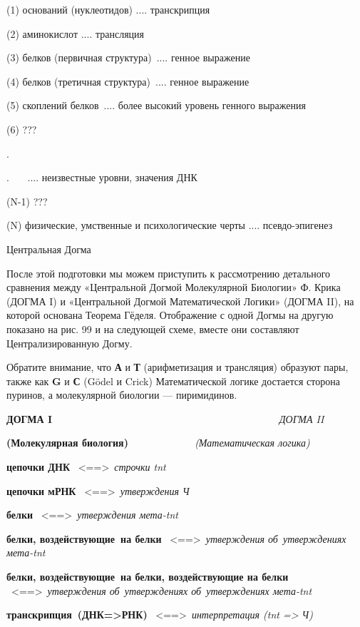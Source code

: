 \documentclass[../main.tex]{subfiles}
\begin{document}
(1) оснований (нуклеотидов) .... транскрипция

(2) аминокислот .... трансляция

(3) белков (первичная структура)~.... генное выражение

(4) белков (третичная структура)~.... генное выражение

(5) скоплений белков~.... более высокий уровень генного выражения

(6) ???

.

.~~~ .... неизвестные уровни, значения ДНК

(N-1) ???

(N) физические, умственные и психологические черты .... псевдо-эпигенез

Центральная Догма

После этой подготовки мы можем приступить к рассмотрению детального сравнения между «Центральной Догмой Молекулярной Биологии» Ф. Крика (ДОГМА I) и «Центральной Догмой Математической Логики» (ДОГМА II), на которой основана Теорема Гёделя. Отображение с одной Догмы на другую показано на рис. 99 и на следующей схеме, вместе они составляют Централизированную Догму.

Обратите внимание, что \textbf{А} и \textbf{Т} (арифметизация и трансляция) образуют пары, также как \textbf{G} и \textbf{С} (Gödel и Crick) Математической логике достается сторона пуринов, а молекулярной биологии --- пиримидинов.

\textbf{ДОГМА I~~~~~~~~~~~~~~~~~~~~~~~~~~~~~~~~~~~~~~~} \emph{ДОГМА II}

\textbf{(Молекулярная биология)~~~~~~~~~~~} \emph{(Математическая логика)}

\textbf{цепочки ДНК} ~\textless==\textgreater~\emph{строчки \acs{tnt}}

\textbf{цепочки мРНК} ~\textless==\textgreater~\emph{утверждения Ч}

\textbf{белки} ~\textless==\textgreater~\emph{утверждения мета-\acs{tnt}}

\textbf{белки, воздействующие~на белки} ~\textless==\textgreater~\emph{утверждения об~утверждениях мета-\acs{tnt}}

\textbf{белки, воздействующие~на белки, воздействующие на белки} ~\textless==\textgreater~\emph{утверждения об~утверждениях об~утверждениях мета-\acs{tnt}}

\textbf{транскрипция~(ДНК=\textgreater РНК)} ~\textless==\textgreater~\emph{интерпретация (\acs{tnt} =\textgreater{} Ч)}
\end{document}
